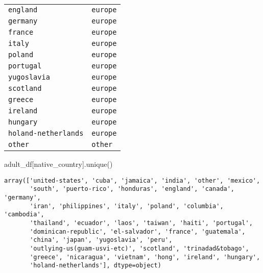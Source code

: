 \documentclass[
  letterpaper,
  DIV=11,
  numbers=noendperiod]{scrartcl}
\newenvironment{Shaded}{\begin{snugshade}}{\end{snugshade}}
\newcommand{\NormalTok}[1]{\textcolor[rgb]{0.00,0.23,0.31}{#1}}
\newcommand{\StringTok}[1]{\textcolor[rgb]{0.13,0.47,0.30}{#1}}
\begin{document}
\begin{longtable}[]{@{}ll@{}}
\texttt{england} & \texttt{europe} \\
\texttt{germany} & \texttt{europe} \\
\texttt{france} & \texttt{europe} \\
\texttt{italy} & \texttt{europe} \\
\texttt{poland} & \texttt{europe} \\
\texttt{portugal} & \texttt{europe} \\
\texttt{yugoslavia} & \texttt{europe} \\
\texttt{scotland} & \texttt{europe} \\
\texttt{greece} & \texttt{europe} \\
\texttt{ireland} & \texttt{europe} \\
\texttt{hungary} & \texttt{europe} \\
\texttt{holand-netherlands} & \texttt{europe} \\
\texttt{other} & \texttt{other} \\
\end{longtable}

\begin{Shaded}
\begin{Highlighting}[]
\NormalTok{adult\_df[}\StringTok{\textquotesingle{}native\_country\textquotesingle{}}\NormalTok{].unique()}
\end{Highlighting}
\end{Shaded}

\begin{verbatim}
array(['united-states', 'cuba', 'jamaica', 'india', 'other', 'mexico',
       'south', 'puerto-rico', 'honduras', 'england', 'canada', 'germany',
       'iran', 'philippines', 'italy', 'poland', 'columbia', 'cambodia',
       'thailand', 'ecuador', 'laos', 'taiwan', 'haiti', 'portugal',
       'dominican-republic', 'el-salvador', 'france', 'guatemala',
       'china', 'japan', 'yugoslavia', 'peru',
       'outlying-us(guam-usvi-etc)', 'scotland', 'trinadad&tobago',
       'greece', 'nicaragua', 'vietnam', 'hong', 'ireland', 'hungary',
       'holand-netherlands'], dtype=object)
\end{verbatim}
\end{document}
